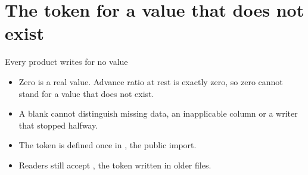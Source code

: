 %
\section{The token for a value that does not exist}

\begin{frame}{Every product writes  for no value}
\begin{itemize}\small
  \item Zero is a real value. Advance ratio at rest is exactly zero,
        so zero cannot stand for a value that does not exist.
  \item A blank cannot distinguish missing data, an inapplicable column
        or a writer that stopped halfway.
  \item The token is defined once in
        , the public import.
  \item Readers still accept \code{-}, the token written in older files.
\end{itemize}
\end{frame}
